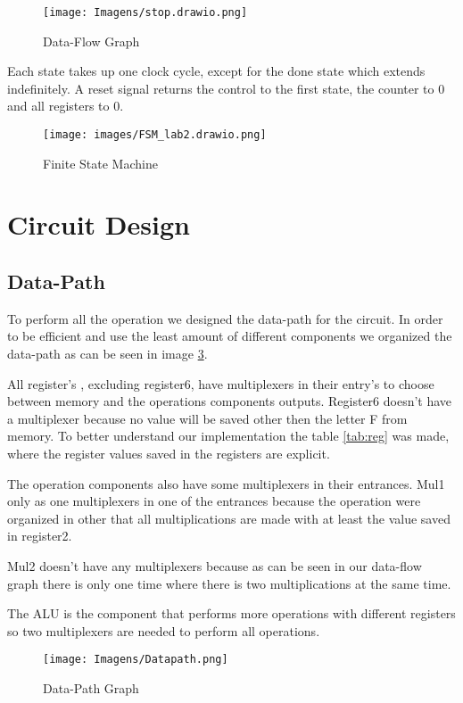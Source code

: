 \documentclass[12pt]{article}
\begin{document}
\begin{figure}[H]
	\centering
	\texttt{[image: Imagens/stop.drawio.png]}
	\caption{Data-Flow Graph}
	\label{fig:sch}
\end{figure}


Each state takes up one clock cycle, except for the done state which extends indefinitely. A reset signal returns the control to the first state, the counter to 0 and all registers to 0.

\begin{figure}[H]
	\centering
	\texttt{[image: images/FSM\_lab2.drawio.png]}
	\caption{Finite State Machine}
	\label{fig:fsm}
\end{figure}

\section{Circuit Design}
\subsection{Data-Path}
To perform all the operation we designed the data-path for the circuit. In order to be efficient and use the least amount of different components we organized the data-path as can be seen in image \ref{fig:path}. 

All register's , excluding register6, have multiplexers in their entry's to choose between memory and the operations components outputs. Register6 doesn't have a multiplexer because no value will be saved other then the letter F from memory. To better understand our implementation the table \ref{tab:reg} was made, where the register values saved in the registers are explicit.

The operation components also have some multiplexers in their entrances. Mul1 only as one multiplexers in one of the entrances because the operation were organized in other that all multiplications are made with at least the value saved in register2. 

Mul2 doesn't have any multiplexers because as can be seen in our data-flow graph there is only one time where there is two multiplications at the same time.

The ALU is the component that performs more operations with different registers so two multiplexers are needed to perform all operations.

\begin{figure}[H]
	\centering
	\texttt{[image: Imagens/Datapath.png]}
	\caption{Data-Path Graph}
	\label{fig:path}
\end{figure}
\end{document}

